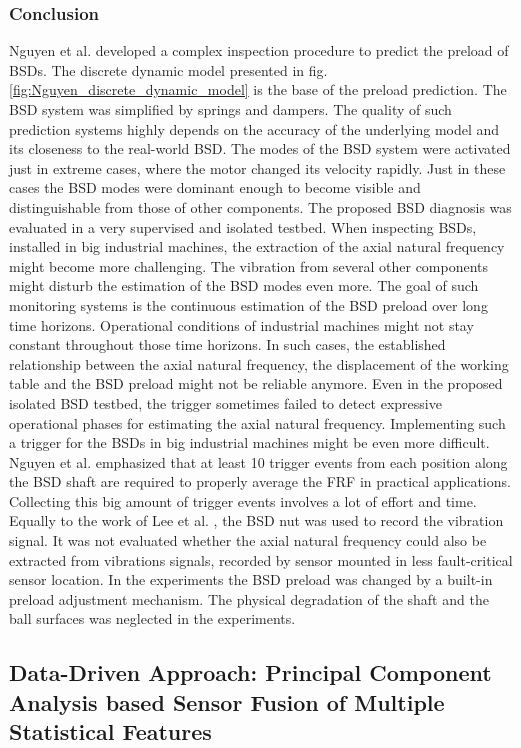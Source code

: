 \subsubsection{Conclusion}
Nguyen et al. \cite{NGUYEN2019} developed a complex inspection procedure to predict the preload of BSDs. The discrete dynamic model presented in fig. \ref{fig:Nguyen_discrete_dynamic_model} is the base of the preload prediction. The BSD system was simplified by springs and dampers. The quality of such prediction systems highly depends on the accuracy of the underlying model and its closeness to the real-world BSD. The modes of the BSD system were activated just in extreme cases, where the motor changed its velocity rapidly. Just in these cases the BSD modes were dominant enough to become visible and distinguishable from those of other components. The proposed BSD diagnosis was evaluated in a very supervised and isolated testbed. When inspecting BSDs, installed in big industrial machines, the extraction of the axial natural frequency might become more challenging. The vibration from several other components might disturb the estimation of the BSD modes even more. The goal of such monitoring systems is the continuous estimation of the BSD preload over long time horizons. Operational conditions of industrial machines might not stay constant throughout those time horizons. In such cases, the established relationship between the axial natural frequency, the displacement of the working table and the BSD preload might not be reliable anymore. Even in the proposed isolated BSD testbed, the trigger sometimes failed to detect expressive operational phases for estimating the axial natural frequency. Implementing such a trigger for the BSDs in big industrial machines might be even more difficult. Nguyen et al. \cite{NGUYEN2019} emphasized that at least 10 trigger events from each position along the BSD shaft are required to properly average the FRF in practical applications. Collecting this big amount of trigger events involves a lot of effort and time. Equally to the work of Lee et al. \cite{Lee2015}, the BSD nut was used to record the vibration signal. It was not evaluated whether the axial natural frequency could also be extracted from vibrations signals, recorded by sensor mounted in less fault-critical sensor location. In the experiments the BSD preload was changed by a built-in preload adjustment mechanism. The physical degradation of the shaft and the ball surfaces was neglected in the experiments.

\subsection{Data-Driven Approach: Principal Component Analysis based Sensor Fusion of Multiple Statistical Features}

